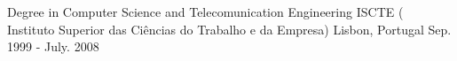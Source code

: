 

\begin{cventries}

  \cventry
    {Degree in Computer Science and Telecomunication Engineering} %
    {ISCTE ( Instituto Superior das Ciências do Trabalho e da Empresa)} %
    {Lisbon, Portugal} %
    {Sep. 1999 - July. 2008} %
    {
    }

\end{cventries}
